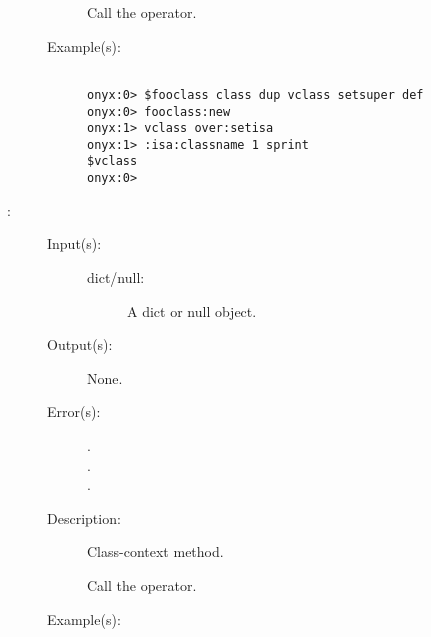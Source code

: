 \begin{description}
\begin{description}
		Call the 
		operator.
	\item[Example(s): ]\begin{verbatim}

onyx:0> $fooclass class dup vclass setsuper def
onyx:0> fooclass:new
onyx:1> vclass over:setisa
onyx:1> :isa:classname 1 sprint
$vclass
onyx:0>
		\end{verbatim}
	\end{description}
\label{vclass:setmethods}
\item[{\onyxop{dict/null}{setmethods}{--}}: ]
	\begin{description}\item[]
	\item[Input(s): ]
		\begin{description}\item[]
		\item[dict/null: ]
			A dict or null object.
		\end{description}
	\item[Output(s): ] None.
	\item[Error(s): ]
		\begin{description}\item[]
		\item[.]
		\item[.]
		\item[.]
		\end{description}
	\item[Description: ]
		Class-context method.

		Call the
		operator.
	\item[Example(s): ]\begin{verbatim}


\end{verbatim}
\end{description}
\end{description}
